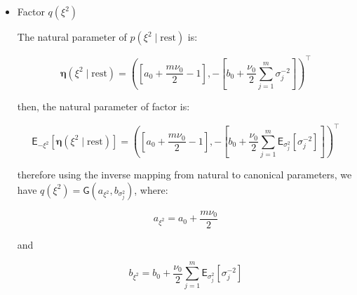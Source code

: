 \begin{appendix}
\begin{itemize}
and

\begin{equation}
b_{\sigma_j^2}= \frac{ \nu_0 \mathsf{E}_{\xi^2}\left[\xi^2\right] +  \mathsf{E}_{\bm{\beta}_j}\left[\left(\bm{y}_{j} - \bm{X}_{j} \bm{\beta}_j)^\top(\bm{y}_{j} - \bm{X}_{j} \bm{\beta}_j\right)\right]}{2}
\end{equation}

\item Factor $q(\xi^2)$

The natural parameter of $p(\xi^2\mid \text{rest}) $ is:

\begin{equation}
\bm{\eta}(\xi^2\mid \text{rest})=\left(\left[ a_0 +\frac{m \nu_0}{2} -1\right],-\left[ b_0 + \frac{\nu_0}{2} \sum_{j=1}^{m} \sigma_j^{-2}\right]\right)^\top
\end{equation}

then, the natural parameter of factor is:

\begin{equation}
\mathsf{E}_{-\xi^2}\left[\bm{\eta}(\xi^2\mid \text{rest})\right]=\left(\left[ a_0 +\frac{m \nu_0}{2} -1\right],-\left[ b_0 + \frac{\nu_0}{2} \sum_{j=1}^{m} \mathsf{E}_{\sigma^2_j}\left[\sigma_j^{-2}\right]\right]\right)^\top
\end{equation}

therefore using the inverse mapping from natural to canonical parameters, we have $q(\xi^2)=\mathsf{G}(a_{\xi^2},b_{\sigma_j^2})$, where:

\begin{equation}
a_{\xi^2}=  a_0 +\frac{m \nu_0}{2}
\end{equation}

and

\begin{equation}
b_{\xi^2}= b_0 + \frac{\nu_0}{2} \sum_{j=1}^{m} \mathsf{E}_{\sigma^2_j}\left[\sigma_j^{-2}\right]
\end{equation}


\end{itemize}
\end{appendix}
